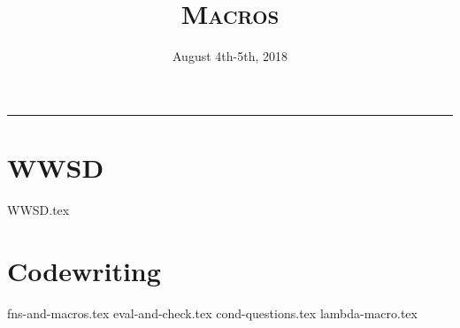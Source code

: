 \documentclass{exam}
\title{\textsc{Macros}}
\date{August 4th-5th, 2018}
\begin{document}
\maketitle
\rule{\textwidth}{0.15em}
\fontsize{12}{15}\selectfont

\section{WWSD}
\begin{questions}
{WWSD.tex}
\end{questions}


\section{Codewriting}
\begin{questions}
{fns-and-macros.tex}
{eval-and-check.tex}
{cond-questions.tex}
{lambda-macro.tex}
\end{questions}
\end{document}
